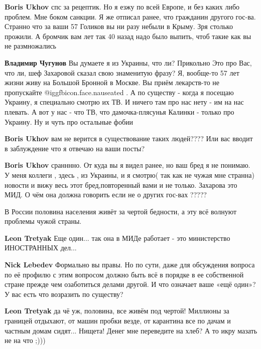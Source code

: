 \begin{itemize}
\begin{itemize}
\textbf{Boris Ukhov} спс за рецептик. Но я езжу по всей Европе, и без каких либо проблем. Мне боком санкции. Я же отписал ранее, что гражданин другого гос-ва. Странно что за ваши 57 Голиков вы ни разу небыли в Крыму. Зря столько прожили. А бромчик вам лет так 40 назад надо было выпить, чтоб такие как вы не размножались

\textbf{Владимир Чугунов} Вы думаете я из Украины, что ли?
Прикольно
Это про Вас, что ли, шеф Захаровой сказал свою знаменитую фразу?
Я, вообще-то 57 лет жизни живу на Большой Бронной в Москве.
Вы приём лекарств-то не пропускайте @igg{fbicon.face.nauseated} .
А по существу - когда я посещаю Украину, я специально смотрю их ТВ. И ничего там про нас нету - им на нас плевать. А вот у нас - что ТВ, что дамочка-плясунья Калинки - только про Украину. Ну и чуть про остальные фобии

\textbf{Boris Ukhov} вам не верится в существование таких людей???? Или вас вводит в заблуждение что я отвечаю на ваши посты?

\textbf{Boris Ukhov} сранннно. От куда вы я видел ранее, но ваш бред я не понимаю. У меня коллеги , здесь , из Украины, и я смотрю( так как не чужая мне странна) новости и вижу весь этот бред,повторенный вами и не только. Захарова это МИД. О чём она должна говорить если не о других гос-вах ?????

\end{itemize} %


В России половина населения живёт за чертой бедности, а эту всё волнуют
проблемы чужой страны.

\begin{itemize} %
\textbf{Leon Tretyak} Еще один... так она в МИДе работает - это министерство ИНОСТРАННЫХ дел...

\textbf{Nick Lebedev} Формально вы правы. Но по сути, даже для обсуждения вопроса по её профилю с этим вопросом должно быть всё в порядке в ее собственной стране прежде чем озаботиться делами другой. И что означает ваше «ещё один»? У вас есть что возразить по существу?

\textbf{Leon Tretyak} да чё уж, половина, все живём под чертой! Миллионы за границей отдыхают, от машин пробки везде, от карантина все по дачам и частным домам сидят... Нищета! Денег мне переведите на хлеб? А то икру мазать не на что ;)))


\end{itemize}
\end{itemize}
